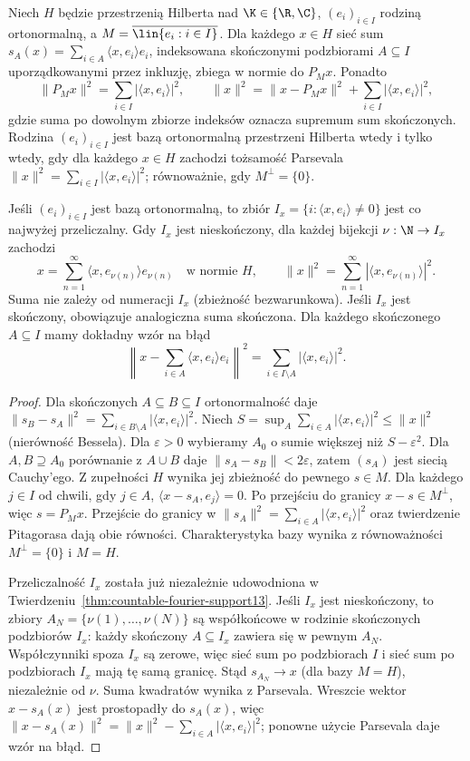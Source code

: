 \begin{twierdzenie}
\label{thm:parseval13}
\label{cor:fourier-enumeration13}
Niech $H$ będzie przestrzenią Hilberta nad $\K\in\{\R,\C\}$,
$(e_i)_{i\in I}$ rodziną ortonormalną, a
$M=\overline{\lin\{e_i:i\in I\}}$. Dla każdego $x\in H$
sieć sum $s_A(x)=\sum_{i\in A}\langle x,e_i\rangle e_i$,
indeksowana skończonymi podzbiorami $A\subseteq I$ uporządkowanymi
przez inkluzję, zbiega w normie do $P_Mx$. Ponadto
\[
 \|P_Mx\|^2=\sum_{i\in I}|\langle x,e_i\rangle|^2,
 \qquad
 \|x\|^2=\|x-P_Mx\|^2+
               \sum_{i\in I}|\langle x,e_i\rangle|^2,
\]
gdzie suma po dowolnym zbiorze indeksów oznacza supremum
sum skończonych. Rodzina $(e_i)_{i\in I}$ jest bazą ortonormalną
przestrzeni Hilberta wtedy i tylko wtedy, gdy dla każdego $x\in H$
zachodzi tożsamość Parsevala $\|x\|^2=\sum_{i\in I}
|\langle x,e_i\rangle|^2$; równoważnie, gdy
$M^\perp=\{0\}$.

Jeśli $(e_i)_{i\in I}$ jest bazą ortonormalną, to zbiór
$I_x=\{i:\langle x,e_i\rangle\ne0\}$ jest co najwyżej
przeliczalny. Gdy $I_x$ jest nieskończony, dla każdej bijekcji
$\nu:\N\to I_x$ zachodzi
\[
 x=\sum_{n=1}^{\infty}\langle x,e_{\nu(n)}\rangle e_{\nu(n)}
 \quad\text{w normie $H$},\qquad
 \|x\|^2=\sum_{n=1}^{\infty}|\langle x,e_{\nu(n)}\rangle|^2.
\]
Suma nie zależy od numeracji $I_x$ (zbieżność bezwarunkowa).
Jeśli $I_x$ jest skończony, obowiązuje analogiczna suma skończona.
Dla każdego skończonego $A\subseteq I$ mamy dokładny wzór na błąd
\[
 \left\|x-\sum_{i\in A}\langle x,e_i\rangle e_i\right\|^2
 =\sum_{i\in I\setminus A}|\langle x,e_i\rangle|^2.
\]
\end{twierdzenie}
\begin{proof}
Dla skończonych $A\subseteq B\subseteq I$ ortonormalność daje
$\|s_B-s_A\|^2=\sum_{i\in B\setminus A}|\langle x,e_i\rangle|^2$.
Niech $S=\sup_A\sum_{i\in A}|\langle x,e_i\rangle|^2
\le\|x\|^2$ (nierówność Bessela). Dla $\varepsilon>0$ wybieramy
$A_0$ o sumie większej niż $S-\varepsilon^2$.
Dla $A,B\supseteq A_0$ porównanie z $A\cup B$ daje
$\|s_A-s_B\|<2\varepsilon$, zatem $(s_A)$ jest siecią
Cauchy'ego. Z zupełności $H$ wynika jej zbieżność do pewnego
$s\in M$. Dla każdego $j\in I$ od chwili, gdy $j\in A$,
$\langle x-s_A,e_j\rangle=0$. Po przejściu do granicy
$x-s\in M^\perp$, więc $s=P_Mx$. Przejście do granicy
w $\|s_A\|^2=\sum_{i\in A}|\langle x,e_i\rangle|^2$
oraz twierdzenie Pitagorasa dają obie równości.
Charakterystyka bazy wynika z równoważności $M^\perp=\{0\}$
i $M=H$.

Przeliczalność $I_x$ została już niezależnie udowodniona
w Twierdzeniu~\ref{thm:countable-fourier-support13}.
Jeśli $I_x$ jest nieskończony, to zbiory
$A_N=\{\nu(1),\ldots,\nu(N)\}$ są współkońcowe w rodzinie
skończonych podzbiorów $I_x$: każdy skończony
$A\subseteq I_x$ zawiera się w pewnym $A_N$. Współczynniki
spoza $I_x$ są zerowe, więc sieć sum po podzbiorach $I$ i
sieć sum po podzbiorach $I_x$ mają tę samą granicę.
Stąd $s_{A_N}\to x$ (dla bazy $M=H$), niezależnie od $\nu$.
Suma kwadratów wynika z Parsevala. Wreszcie wektor
$x-s_A(x)$ jest prostopadły do $s_A(x)$, więc
$\|x-s_A(x)\|^2=\|x\|^2-\sum_{i\in A}|\langle x,e_i\rangle|^2$;
ponowne użycie Parsevala daje wzór na błąd.
\end{proof}

